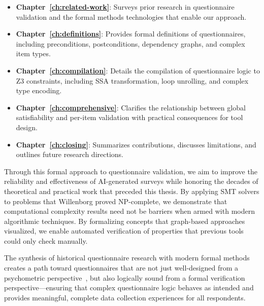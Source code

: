 \begin{itemize}
    \item \textbf{Chapter~\ref{ch:related-work}}: Surveys prior research in questionnaire validation and the formal methods technologies that enable our approach.

    \item \textbf{Chapter~\ref{ch:definitions}}: Provides formal definitions of questionnaires, including preconditions, postconditions, dependency graphs, and complex item types.

    \item \textbf{Chapter~\ref{ch:compilation}}: Details the compilation of questionnaire logic to Z3 constraints, including SSA transformation, loop unrolling, and complex type encoding.

    \item \textbf{Chapter~\ref{ch:comprehensive}}: Clarifies the relationship between global satisfiability and per-item validation with practical consequences for tool design.

    \item \textbf{Chapter~\ref{ch:closing}}: Summarizes contributions, discusses limitations, and outlines future research directions.
\end{itemize}

Through this formal approach to questionnaire validation, we aim to improve the reliability and effectiveness of AI-generated surveys while honoring the decades of theoretical and practical work that preceded this thesis. By applying SMT solvers to problems that Willenborg proved NP-complete, we demonstrate that computational complexity results need not be barriers when armed with modern algorithmic techniques. By formalizing concepts that graph-based approaches visualized, we enable automated verification of properties that previous tools could only check manually.

The synthesis of historical questionnaire research with modern formal methods creates a path toward questionnaires that are not just well-designed from a psychometric perspective~\cite{dillman2014internet, taherdoost2016validity}, but also logically sound from a formal verification perspective—ensuring that complex questionnaire logic behaves as intended and provides meaningful, complete data collection experiences for all respondents.
